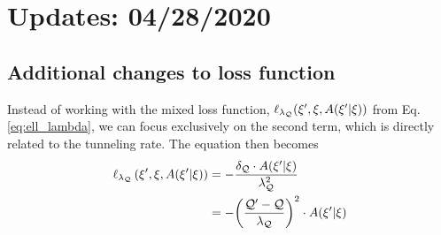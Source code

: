 \section{Updates: 04/28/2020}%
\label{sec:updates_2020_04_28}
%
\subsection{Additional changes to loss function}%
\label{subsec:additional_changes_to_loss_fn}
%
Instead of working with the mixed loss function,
\(\ell_{\lambda_{\mathcal{Q}}}({\xi^{\prime}}, \xi, A({\xi^{\prime}}|\xi))\) from
Eq.\ref{eq:ell_lambda}, we can focus exclusively on the second term, which is
directly related to the tunneling rate.
%
The equation then becomes
%
\begin{align}
  \ell_{\lambda_{{\mathcal{Q}}}}\left({\xi^{\prime}}, \xi, A({\xi^{\prime}}|\xi)\right) 
  &= - \frac{\delta_{{\mathcal{Q}}}\cdot A(\xi^{\prime}|\xi)}{\lambda_{{\mathcal{Q}}}^{2}}\\
  &= - {\left(\frac{{\mathcal{Q}^{\prime} -
  \mathcal{Q}}}{\lambda_\mathcal{Q}}\right)}^{2}\cdot
    A(\xi^{\prime}|\xi)
\end{align}
